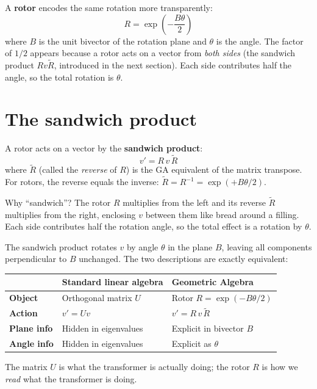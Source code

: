 \documentclass[11pt, twoside, openright]{memoir}
\newcommand{\gp}{\,}              %
\newcommand{\rev}[1]{\widetilde{#1}} %
\numberwithin{equation}{chapter}
\begin{document}
A \textbf{rotor} encodes the same rotation more transparently:
\begin{equation}
\label{eq:rotor-def}
  R = \exp\!\left(-\frac{B \theta}{2}\right)
\end{equation}
where $B$ is the unit bivector of the rotation plane and $\theta$ is the
angle.  The factor of $1/2$ appears because a rotor acts on a vector from
\emph{both sides} (the sandwich product $Rv\rev{R}$, introduced in the
next section).  Each side contributes half the angle, so the total
rotation is $\theta$.

\section{The sandwich product}

A rotor acts on a vector by the \textbf{sandwich product}:
\begin{equation}
\label{eq:sandwich}
  v' = R \gp v \gp \rev{R}
\end{equation}
where $\widetilde{R}$ (called the \emph{reverse} of $R$) is the GA
equivalent of the matrix transpose.  For rotors, the reverse equals the
inverse: $\widetilde{R} = R^{-1} = \exp(+B\theta/2)$.

Why ``sandwich''?  The rotor $R$ multiplies from the left and its
reverse $\rev{R}$ multiplies from the right, enclosing $v$ between them
like bread around a filling.  Each side contributes half the rotation
angle, so the total effect is a rotation by $\theta$.

\begin{keyidea}
The sandwich product rotates $v$ by angle $\theta$ in the plane $B$,
leaving all components perpendicular to $B$ unchanged.  The two
descriptions are exactly equivalent:

\medskip
\renewcommand{\arraystretch}{1.3}\small
\begin{tabular}{@{}lll@{}}
\toprule
 & \textbf{Standard linear algebra} & \textbf{Geometric Algebra} \\
\midrule
\textbf{Object} & Orthogonal matrix $U$ & Rotor $R = \exp(-B\theta/2)$ \\
\textbf{Action} & $v' = Uv$ & $v' = R\,v\,\rev{R}$ \\
\textbf{Plane info} & Hidden in eigenvalues & Explicit in bivector $B$ \\
\textbf{Angle info} & Hidden in eigenvalues & Explicit as $\theta$ \\
\bottomrule
\end{tabular}

\medskip
The matrix $U$ is what the transformer is actually doing; the rotor
$R$ is how we \emph{read} what the transformer is doing.
\end{keyidea}
\end{document}
